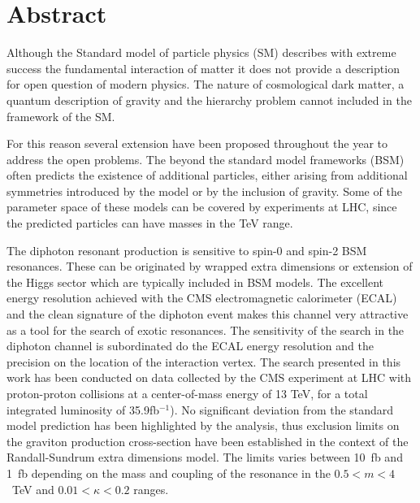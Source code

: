 \chapter*{Abstract}

Although the Standard model of particle physics (SM) describes with extreme success the
fundamental interaction of matter it does not provide a description for open question of
modern physics. The nature of cosmological dark matter, a quantum description of gravity and
the hierarchy problem cannot included in the framework of the SM.

For this reason several extension have been proposed throughout the year to address the open problems.
The beyond the standard model frameworks (BSM) often predicts the existence of additional particles,
either arising from additional symmetries introduced by the model or by the inclusion of gravity.
Some of the parameter space of these models can be covered by experiments at LHC, since the predicted particles
can have masses in the TeV range.

The diphoton resonant production is sensitive to spin-0 and spin-2 BSM resonances. These can be originated
by wrapped extra dimensions or extension of the Higgs sector which are typically included in BSM models.
The excellent energy resolution achieved with the CMS electromagnetic calorimeter (ECAL) and the clean signature
of the diphoton event makes this channel very attractive as a tool for the search of exotic resonances.
The sensitivity of the search in the diphoton channel is subordinated do the ECAL energy resolution and the
precision on the location of the interaction vertex. The search presented in this work has been conducted
on data collected by the CMS experiment at LHC with proton-proton collisions at a center-of-mass energy of 13 TeV,
for a total integrated luminosity of 35.9fb$^{-1}$).
No significant deviation from the standard model prediction has been highlighted by the analysis, thus
exclusion limits on the graviton production cross-section have been established in the context of the Randall-Sundrum
extra dimensions model.
The limits varies between 10~fb and 1~fb depending on the mass and coupling of the resonance in the 
$0.5 < m < 4$~TeV and $0.01 < \kappa < 0.2$ ranges.

